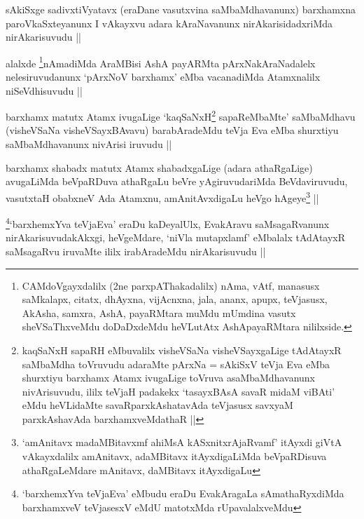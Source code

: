 \begin{artha}
sAkiSxge sadivxtiVyatavx (eraDane vasutxvina saMbaMdhavanunx)
barxhamxna paroVkaSxteyanunx I vAkayxvu adara kAraNavanunx
nirAkarisidadxriMda nirAkarisuvudu ||
\end{artha}

\begin{artha}
alalxde \footnote{CAMdoVgayxdalilx (2ne parxpAThakadalilx) nAma, vAtf,
  manasusx saMkalapx, citatx, dhAyxna, vijAcnxna, jala, ananx, apupx,
  teVjasusx, AkAsha, samxra, AshA, payaRMtara muMdu mUmdina vasutx
  sheVSaThxveMdu doDaDxdeMdu heVLutAtx AshApayaRMtara nililxside.}nAmadiMda AraMBisi AshA payARMta pArxNakAraNadalelx
nelesiruvudanunx `pArxNoV barxhamx' eMba vacanadiMda Atamxnalilx
niSeVdhisuvudu ||
\end{artha}


\begin{artha}
barxhamx matutx Atamx ivugaLige `kaqSaNxH\footnote{kaqSaNxH sapaRH
  eMbuvalilx visheVSaNa visheVSayxgaLige tAdAtayxR saMbaMdha toVruvudu
adaraMte pArxNa = sAkiSxV teVja Eva eMba shurxtiyu barxhamx Atamx
ivugaLige toVruva asaMbaMdhavanunx nivArisuvudu, ililx teVjaH padakekx
`tasayxBAsA savaR midaM viBAti' eMdu heVLidaMte savaRparxkAshatavAda
teVjasusx savxyaM parxkAshavAda barxhamxveMdathaR ||} sapaReMbaMte'
saMbaMdhavu (visheVSaNa visheVSayxBAvavu) barabAradeMdu teVja Eva eMba
shurxtiyu saMbaMdhavanunx nivArisi iruvudu ||
\end{artha}


\begin{artha}
barxhamx shabadx matutx Atamx shabadxgaLige (adara athaRgaLige)
avugaLiMda beVpaRDuva athaRgaLu beVre yAgiruvudariMda BeVdaviruvudu,
vasutxtaH obabxneV Ada Atamxnu, amAnitAvxdigaLu heVgo
hAgeye\footnote{`amAnitavx madaMBitavxmf ahiMsA kASxnitxrAjaRvamf'
  itAyxdi giVtA vAkayxdalilx amAnitavx, adaMBitavx itAyxdigaLiMda
  beVpaRDisuva athaRgaLeMdare mAnitavx, daMBitavx itAyxdigaLu} ||
\end{artha}

\begin{artha}
\footnote{`barxhemxYva teVjaEva' eMbudu eraDu EvakAragaLa
  sAmathaRyxdiMda barxhamxveV teVjasesxV eMdU matotxMda rUpavalalxveMdu}`barxhemxYva teVjaEva' eraDu kaDeyalUlx, EvakAravu
saMsagaRvanunx nirAkarisuvudakAkxgi, heVgeMdare, `niVla mutapxlamf'
eMbalalx tAdAtayxR saMsagaRvu iruvaMte ililx irabAradeMdu
nirAkarisuvudu ||
\end{artha}

